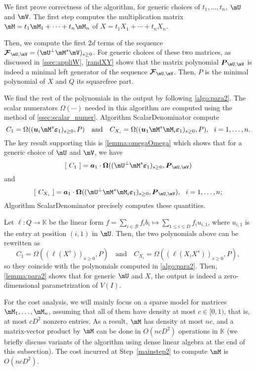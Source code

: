 \documentclass[12pt]{article}
\newcommand{\mat}[1]{\bm{\MakeUppercase{#1}}} %
\newcommand{\row}[1]{\bm{\MakeLowercase{#1}}} %
\newcommand{\col}[1]{\bm{\MakeLowercase{#1}}} %
\newcommand{\seq}{\mat{\mathcal{F}}} %
\newcommand{\basis}{\mathscr{B}}
\newcommand{\minpoly}{P}
\newcommand{\lf}{X}
\def\K{\mathbb{K}}
\def\K {\ensuremath{\mathbb{K}}}
\begin{document}
We first prove correctness of the algorithm, for generic choices of
$t_1,\dots,t_n$, $\mU$ and $\mV$. The first step computes the
multiplication matrix $\mM=t_1 \mM_1 + \cdots + t_n \mM_n$ of $\lf=t_1
X_1 + \cdots + t_n X_n$.

Then, we compute the first $2d$ terms of the sequence $\seq_{\mU,\mV}=
(\mU^{\perp}\mM^s\mV)_{s\ge 0}$. For generic choices of these two
matrices, as discussed in \cref{ssec:appliW}, \cref{randXY} shows that
the matrix polynomial $\mat{P}_{\mU,\mV}$ is indeed a minimal left
generator of the sequence $\seq_{\mU,\mV}$. Then, $\minpoly$ is the minimal 
polynomial of $\lf$ and $Q$ its squarefree part.

We find the rest of the polynomials in the output by following
\cref{algo:para2}. The scalar numerators $\Omega(\cdots)$ needed in
this algorithm are computed using the method of
\cref{ssec:scalar_numer}. Algorithm ScalarDenominator
compute $$C_1 = \Omega((\row{u}_i \mM^s \col{\varepsilon}_1)_{s \ge 0}, \minpoly)
\quad\text{and}\quad
C_{X_i} = \Omega((\row{u}_1 \mM^s \mM_i \col{\varepsilon}_1)_{s \ge 0}, \minpoly),\ \ i=1,\dots,n.$$
The key result supporting this is \cref{lemma:omegaOmega} which shows
that for a generic choice of $\mU$ and $\mV$, we have 
$$[~C_1~] = \row{a}_1\cdot \mat{\Omega}((\mU^\perp \mM^s \col{\varepsilon}_1)_{s \ge 0}, \mat{P}_{\mU,\mV})$$
and
$$[~C_{X_i}~] = \row{a}_1\cdot \mat{\Omega}((\mU^\perp \mM^s \mM_i \col{\varepsilon}_1)_{s \ge 0}, \mat{P}_{\mU,\mV}),\ \ i=1,\dots,n;
$$
Algorithm ScalarDenominator precisely computes these quantities.

Let $\ell:Q \to \K$ be the linear form $f = \sum_{i \in \basis} f_i b_i \mapsto 
\sum_{1 \le i \le D} f_i u_{i,1}$, where $u_{i,1}$ is the entry at position
$(i,1)$ in $\mU$. Then, the two polynomials above can be rewritten
as 
$$C_1 = \Omega( (\ell(X^s))_{s \ge 0}, \minpoly) \quad\text{and}\quad
C_{X_i} = \Omega( (\ell(X_i X^s))_{s \ge 0}, \minpoly),$$ so they
coincide with the polynomials computed in \cref{algo:para2}.  Then,
\cref{lemma:para2} shows that for generic $\mU$ and $\lf$, the output
is indeed a zero-dimensional parametrization of $V(I)$.  

For the cost analysis, we will mainly focus on a sparse model for
matrices $\mM_1,\dots,\mM_n$, assuming that all of them have density
at most $c \in [0,1)$, that is, at most $c D^2$ nonzero entries.  As a
  result, $\mM$ has density at most $nc$, and a matrix-vector product
  by $\mM$ can be done in $O(ncD^2)$ operations in $\K$ (we briefly
  discuss variants of the algorithm using dense linear algebra at the
  end of this subsection). The cost incurred at Step~\ref{mainstep2}
  to compute $\mM$ is $O(ncD^2)$.
\end{document}
